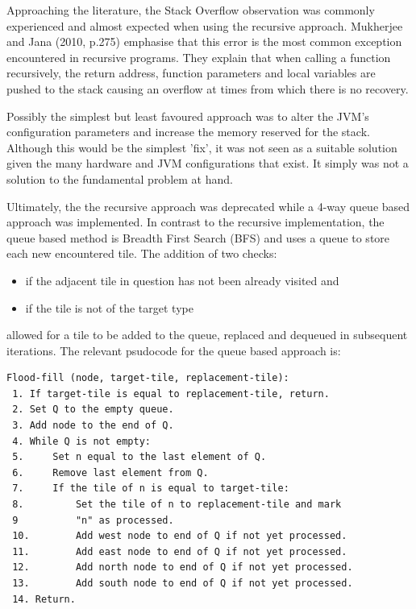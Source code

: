 Approaching the literature, the Stack Overflow observation was commonly experienced and almost expected when using the recursive approach.  Mukherjee and Jana (2010, p.275) emphasise that this error is the most common exception encountered in recursive programs. They explain that when calling a function recursively, the return address, function parameters and local variables are pushed to the stack causing an overflow at times from which there is no recovery.
 
Possibly the simplest but least favoured approach was to alter the JVM's configuration parameters and increase the memory reserved for the stack.  Although this would be the simplest 'fix', it was not seen as a suitable solution given the many hardware and JVM configurations that exist. It simply was not a solution to the fundamental problem at hand.

Ultimately, the the recursive approach was deprecated while a 4-way queue based approach was implemented.  In contrast to the recursive implementation, the queue based method is Breadth First Search (BFS) and uses a queue to store each new encountered tile.  The addition of two checks:

\begin{itemize}
  \item if the adjacent tile in question has not been already visited and
  \item if the tile is not of the target type
\end{itemize}

allowed for a tile to be added to the queue, replaced and dequeued in subsequent iterations. The relevant psudocode for the queue based approach is:

\begin{minipage}{0.9\textwidth}
	\begin{lstlisting}[caption={4-way queue based flood fill}, label={lst:queueFloodFill}]
Flood-fill (node, target-tile, replacement-tile):
 1. If target-tile is equal to replacement-tile, return.
 2. Set Q to the empty queue.
 3. Add node to the end of Q.
 4. While Q is not empty: 
 5.     Set n equal to the last element of Q.
 6.     Remove last element from Q.
 7.     If the tile of n is equal to target-tile:
 8.         Set the tile of n to replacement-tile and mark 
 9			"n" as processed.
 10.        Add west node to end of Q if not yet processed.
 11.        Add east node to end of Q if not yet processed.
 12.        Add north node to end of Q if not yet processed.
 13.        Add south node to end of Q if not yet processed.
 14. Return.
	\end{lstlisting}
\end{minipage}

